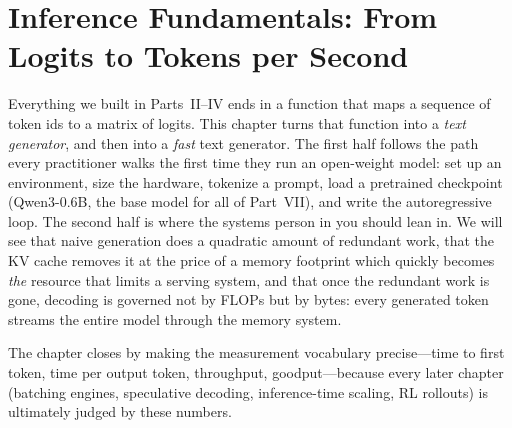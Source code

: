 \chapter{Inference Fundamentals: From Logits to Tokens per Second}\label{ch:inference}

Everything we built in Parts~II--IV ends in a function that maps a sequence of token ids
to a matrix of logits. This chapter turns that function into a \emph{text generator}, and then
into a \emph{fast} text generator. The first half follows the path every practitioner walks the
first time they run an open-weight model: set up an environment, size the hardware, tokenize a
prompt, load a pretrained checkpoint (Qwen3-0.6B, the base model for all of Part~VII), and write
the autoregressive loop. The second half is where the systems person in you should lean in.
We will see that naive generation does a quadratic amount of redundant work, that the KV cache
removes it at the price of a memory footprint which quickly becomes \emph{the} resource that
limits a serving system, and that once the redundant work is gone, decoding is governed not by
FLOPs but by bytes: every generated token streams the entire model through the memory system.

The chapter closes by making the measurement vocabulary precise---time to first token, time per
output token, throughput, goodput---because every later chapter (batching engines, speculative
decoding, inference-time scaling, RL rollouts) is ultimately judged by these numbers.

